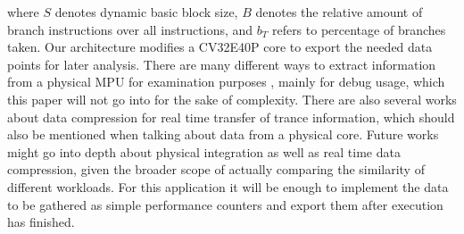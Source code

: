 \documentclass[../bachelor_paper.tex]{subfiles}
\begin{document}
where $S$ denotes dynamic basic block size, $B$ denotes the relative amount of branch instructions over all instructions, and $b_T$ refers to percentage of branches taken. Our architecture modifies a CV32E40P core \cite{PulpplatformPulpissimo2021} to export the needed data points for later analysis. There are many different ways to extract information from a physical \ac{MPU} for examination purposes \cite{dengFlexibleEfficientInstructionGrained2010,jindalDHOOMReusingDesignforDebug2019,mayerDebugSupportCalibration2005}, mainly for debug usage, which this paper will not go into for the sake of complexity. There are also several works about data compression for real time transfer of trance information, which should also be mentioned when talking about data from a physical core. Future works might go into depth about physical integration as well as real time data compression, given the broader scope of actually comparing the similarity of different workloads. For this application it will be enough to implement the data to be gathered as simple performance counters and export them after execution has finished.




\isstandalone



\fi
\end{document}
